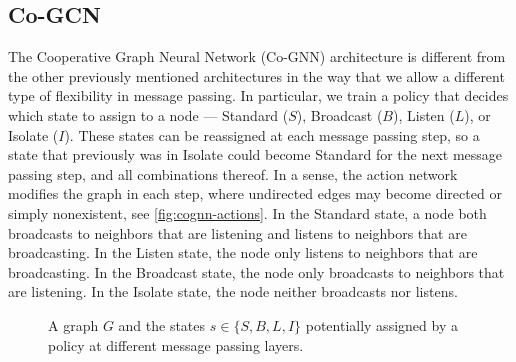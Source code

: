 \documentclass{gdl}
\begin{document}
\subsection{Co-GCN}
The Cooperative Graph Neural Network (Co-GNN) \cite{finkelshtein2024} architecture is different from the other previously mentioned architectures in the way that we allow a different type of flexibility in message passing. In particular, we train a policy that decides which state to assign to a node --- Standard ($S$), Broadcast ($B$), Listen ($L$), or Isolate ($I$). These states can be reassigned at each message passing step, so a state that previously was in Isolate could become Standard for the next message passing step, and all combinations thereof. In a sense, the action network modifies the graph in each step, where undirected edges may become directed or simply nonexistent, see \autoref{fig:cognn-actions}. In the Standard state, a node both broadcasts to neighbors that are listening and listens to neighbors that are broadcasting. In the Listen state, the node only listens to neighbors that are broadcasting. In the Broadcast state, the node only broadcasts to neighbors that are listening. In the Isolate state, the node neither broadcasts nor listens.

\begin{figure}[h!]
    \centering
    \captionsetup{justification=centerlast}
    \caption{A graph $G$ and the states $s \in \{S, B, L, I\}$ potentially assigned by a policy at different message passing layers.}
    \label{fig:cognn-actions} 
\end{figure}
\end{document}

